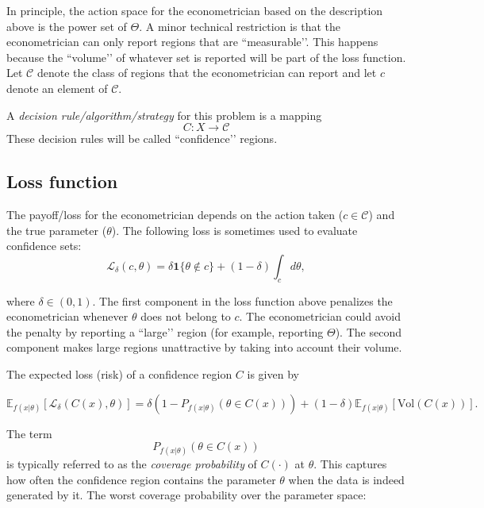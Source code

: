 \documentclass[11pt]{article} %
\begin{document}
In principle, the action space for the econometrician based on the description above is the power set of $\Theta$. A minor technical restriction is that the econometrician can only report regions that are ``measurable’’. This happens because the ``volume’’ of whatever set is reported will be part of the loss function. Let $\mathcal{C}$ denote the class of regions that the econometrician can report and let $c$ denote an element of $\mathcal{C}$. 

A \emph{decision rule/algorithm/strategy} for this problem is a mapping
\begin{equation*}
C:X \rightarrow \mathcal{C}
\end{equation*}
These decision rules will be called ``confidence’’ regions.  


\subsection{Loss function}

The payoff/loss for the econometrician depends on the action taken ($c \in \mathcal{C}$) and the true parameter ($\theta$). The following loss is sometimes used to evaluate confidence sets:
\[ \mathcal{L}_{\delta}(c, \theta) = \delta \mathbf{1}\{ \theta \notin c \} + (1-\delta)\int_{c} d\theta, \]

\noindent where $\delta \in (0,1)$. The first component in the loss function above penalizes the econometrician whenever $\theta$ does not belong to $c$. The econometrician could avoid the penalty by reporting a ``large’’ region (for example, reporting $\Theta$).  The second component makes large regions unattractive by taking into account their volume. 

The expected loss (risk) of a confidence region $C$ is given by

\begin{equation} \label{equation:TypeI}
\mathbb{E}_{f(x|\theta)} [  \mathcal{L}_{\delta}(C(x),\theta)   ] = \delta (1-P_{f(x|\theta)} ( \theta \in C(x) ))  + (1-\delta) \mathbb{E}_{f(x|\theta)} [ \textrm{Vol}(C(x))].
\end{equation}


\noindent The term 
\[ P_{f(x|\theta)} ( \theta \in C(x) ) \]
is typically referred to as the \emph{coverage probability} of $C(\cdot)$ at $\theta$. This captures how often the confidence region contains the parameter $\theta$ when the data is indeed generated by it. The worst coverage probability over the parameter space:
\end{document}
